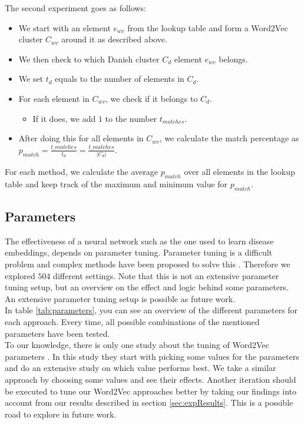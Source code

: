 \noindent The second experiment goes as follows:

\begin{itemize}

\item We start with an element $e_{wv}$ from the lookup table and form a Word2Vec cluster $C_{wv}$ around it as described above.
\item We then check to which Danish cluster $C_d$ element $e_{wv}$ belongs.
\item We set $t_{d}$ equals to the number of elements in $C_d$.
\item For each element in $C_{wv}$, we check if it belongs to $C_d$.
\begin{itemize}
\item If it does, we add $1$ to the number $t_{matches}$.
\end{itemize}
\item After doing this for all elements in $C_{wv}$, we calculate the match percentage as $p_{match} = \frac{t\_{matches}}{t_{d}} = \frac{t\_{matches}}{\left| C_{d} \right|}$.

\end{itemize}

For each method, we calculate the average $p_{match}$ over all elements in the lookup table and keep track of the maximum and minimum value for $p_{match}$.


\subsection{Parameters}
\label{sec:parameters}

The effectiveness of a neural network such as the one used to learn disease embeddings, depends on parameter tuning. Parameter tuning is a difficult problem and complex methods have been proposed to solve this \cite{tuning:article}. Therefore we explored $504$ different settings. Note that this is not an extensive parameter tuning setup, but an overview on the effect and logic behind some parameters. An extensive parameter tuning setup is possible as future work. \\

In table \ref{tab:parameters}, you can see an overview of the different parameters for each approach. Every time, all possible combinations of the mentioned parameters have been tested. \\
To our knowledge, there is only one study about the tuning of Word2Vec parameters \cite{w2vTuning:article}. In this study they start with picking some values for the parameters and do an extensive study on which value performs best. We take a similar approach by choosing some values and see their effects. Another iteration should be executed to tune our Word2Vec approaches better by taking our findings into account from our results described in section \ref{sec:expResults}. This is a possible road to explore in future work. \\

